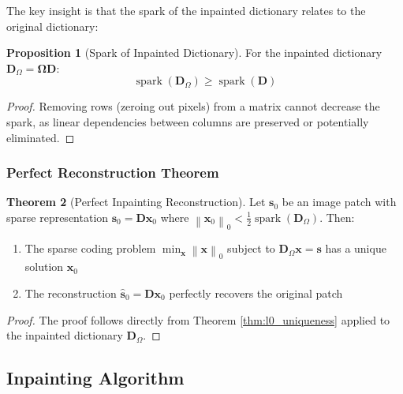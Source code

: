 \documentclass[12pt]{article}
\renewcommand{\vec}[1]{\mathbf{#1}}
\DeclareMathOperator{\spark}{spark}
\newcommand{\zeronorm}[1]{\left\|#1\right\|_0}
\theoremstyle{definition}
\newtheorem{theorem}{Theorem}[section]
\newtheorem{proposition}[theorem]{Proposition}
\begin{document}
The key insight is that the spark of the inpainted dictionary relates to the original dictionary:

\begin{proposition}[Spark of Inpainted Dictionary]
    \label{prop:inpainted_spark}
    For the inpainted dictionary $\mathbf{D}_{\Omega} = \mathbf{\Omega} \mathbf{D}$:
    \begin{equation}
        \spark(\mathbf{D}_{\Omega}) \geq \spark(\mathbf{D})
    \end{equation}
\end{proposition}

\begin{proof}
    Removing rows (zeroing out pixels) from a matrix cannot decrease the spark, as linear dependencies between columns are preserved or potentially eliminated.
\end{proof}

\subsubsection{Perfect Reconstruction Theorem}

\begin{theorem}[Perfect Inpainting Reconstruction]
    \label{thm:perfect_inpainting}
    Let $\vec{s}_0$ be an image patch with sparse representation $\vec{s}_0 = \mathbf{D}\vec{x}_0$ where $\zeronorm{\vec{x}_0} < \frac{1}{2}\spark(\mathbf{D}_{\Omega})$. Then:
    \begin{enumerate}
        \item The sparse coding problem $\min_{\vec{x}} \zeronorm{\vec{x}}$ subject to $\mathbf{D}_{\Omega}\vec{x} = \vec{s}$ has a unique solution $\vec{x}_0$
        \item The reconstruction $\hat{\vec{s}}_0 = \mathbf{D}\vec{x}_0$ perfectly recovers the original patch
    \end{enumerate}
\end{theorem}

\begin{proof}
    The proof follows directly from Theorem \ref{thm:l0_uniqueness} applied to the inpainted dictionary $\mathbf{D}_{\Omega}$.
\end{proof}

\subsection{Inpainting Algorithm}
\end{document}
